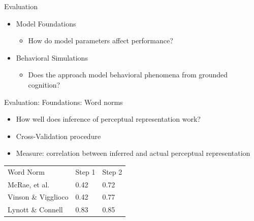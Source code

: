 \documentclass[12pt,a4paper]{beamer}
\begin{document}
\begin{frame}{Evaluation}
\begin{itemize}
    \item Model Foundations
        \begin{itemize}
        \item How do model parameters affect performance?
        \end{itemize}
    \item Behavioral Simulations
        \begin{itemize}
        \item Does the approach model behavioral phenomena from grounded cognition?
        \end{itemize}
\end{itemize}
\end{frame}

\begin{frame}{Evaluation: Foundations: Word norms}
\begin{itemize}
\item How well does inference of perceptual representation work?
\item Cross-Validation procedure
\item Measure: correlation between inferred and actual perceptual representation
\end{itemize}
\begin{table}
    \begin{tabular}{lll}
    Word Norm          & Step 1 & Step 2 \\
    McRae, et al.      & 0.42   & 0.72   \\
    Vinson \& Vigglioco & 0.42   & 0.77   \\
    Lynott \& Connell   & 0.83   & 0.85   \\
    \end{tabular}
\end{table}
\end{frame}
\end{document}
